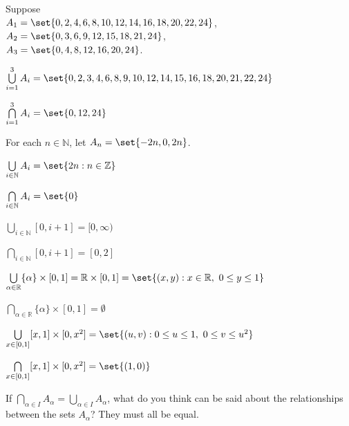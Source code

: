 \documentclass[DIN, pagenumber=false, fontsize=11pt, parskip=half]{scrartcl}
\begin{document}
\begin{problems}
    \problem Suppose\\
             $A_1 = \set{0,2,4,6,8,10,12,14,16,18,20,22,24}$,\\
             $A_2 = \set{0,3,6,9,12,15,18,21,24}$,\\
             $A_3 = \set{0,4,8,12,16,20,24}$.
    \begin{parts}
        \item $\bigcup\limits_{i=1}^{3}A_{i} = \set{0,2,3,4,6,8,9,10,12,14,15,16,18,20,21,22,24}$
        \item $\bigcap\limits_{i=1}^{3}A_{i} = \set{0,12,24}$
    \end{parts}

    \problem For each $n \in \mathbb{N}$, let $A_n = \set{-2n,0,2n}$.
    \begin{parts}
        \item $\bigcup\limits_{i\in\mathbb{N}}A_i = \set{2n : n \in \mathbb{Z}}$
        \item $\bigcap\limits_{i\in\mathbb{N}}A_i = \set{0}$
    \end{parts}

    \problem
    \begin{parts}
        \item $\bigcup\limits_{i\in\mathbb{N}}[0,i+1] = [0,\infty)$
        \item $\bigcap\limits_{i\in\mathbb{N}}[0,i+1] = [0,2]$
    \end{parts}

    \problem
    \begin{parts}
        \item $\bigcup\limits_{\alpha\in\mathbb{R}}\{\alpha\}\times[0,1] = \mathbb{R}\times[0,1] = \set{(x,y) : x \in \mathbb{R},\ 0 \leq y \leq 1}$
        \item $\bigcap\limits_{\alpha\in\mathbb{R}}\{\alpha\}\times[0,1] = \emptyset$
    \end{parts}

    \problem
    \begin{parts}
        \item $\bigcup\limits_{x\in[0,1]}[x,1]\times[0,x^2] = \set{(u,v) : 0 \leq u \leq 1,\ 0 \leq v \leq u^2}$
        \item $\bigcap\limits_{x\in[0,1]}[x,1]\times[0,x^2] = \set{(1,0)}$
    \end{parts}

    \problem If $\bigcap\limits_{\alpha\in I}A_{\alpha} = \bigcup\limits_{\alpha\in I}A_{\alpha}$, what do you think can be said about the relationships between the sets $A_{\alpha}$?
    \answer  They must all be equal.


\end{problems}
\end{document}
